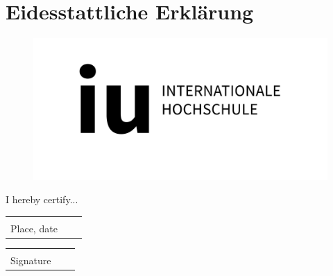 \chapter*{Eidesstattliche Erklärung}

\begin{figure}[t!]
    \raggedleft
    \includegraphics[scale=0.3]{pics/iu_Logo_D_black_RGB_horizontal.jpg}
\end{figure}

\thispagestyle{empty} %

I hereby certify...


\vspace{1,5 cm} 
\begin{tabular}{p{7cm}p{.5cm}l}
\dotfill \\ 
Place, date
\end{tabular}%
\hfill 
\begin{tabular}{p{7cm}p{.5cm}l}
\dotfill \\ 
Signature
\end{tabular}%
